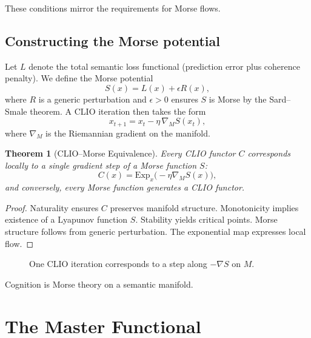 \documentclass[11pt,a4paper,twocolumn]{article}
\newtheorem{theorem}{Theorem}[section]
\begin{document}
These conditions mirror the requirements for Morse flows.

\subsection{Constructing the Morse potential}

Let $L$ denote the total semantic loss functional (prediction error
plus coherence penalty). We define the Morse potential
\[
S(x) = L(x) + \epsilon R(x),
\]
where $R$ is a generic perturbation and $\epsilon > 0$ ensures $S$ is
Morse by the Sard--Smale theorem. A CLIO iteration then takes the form
\[
x_{t+1} = x_t - \eta\,\nabla_M S(x_t),
\]
where $\nabla_M$ is the Riemannian gradient on the manifold.

\begin{theorem}[CLIO--Morse Equivalence]
Every CLIO functor $C$ corresponds locally to a single gradient step
of a Morse function $S$:
\[
C(x) = \mathrm{Exp}_x \big(-\eta \nabla_M S(x)\big),
\]
and conversely, every Morse function generates a CLIO functor.
\end{theorem}

\begin{proof}
Naturality ensures $C$ preserves manifold structure. Monotonicity
implies existence of a Lyapunov function $S$. Stability yields critical
points. Morse structure follows from generic perturbation. The
exponential map expresses local flow.
\end{proof}

\begin{figure}[H]
\centering
{}
\caption{One CLIO iteration corresponds to a step along $-\nabla S$ on $M$.}
\end{figure}

Cognition is Morse theory on a semantic manifold.


\section{The Master Functional}
\end{document}
